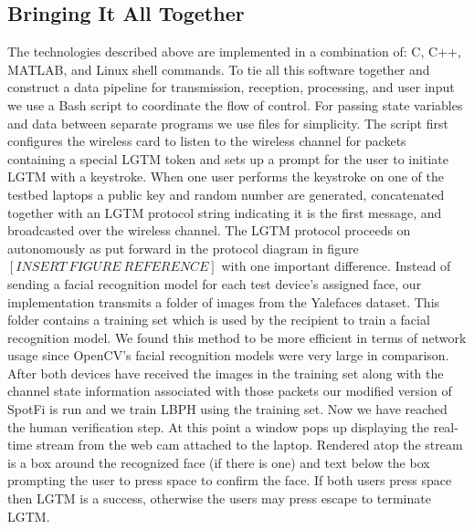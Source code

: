 \documentclass[12pt]{report}
\begin{document}
\subsection{Bringing It All Together}
The technologies described above are implemented in a combination of: C, C++, MATLAB, and Linux shell commands. To tie all this software together and construct a data pipeline for transmission, reception, processing, and user input we use a Bash script to coordinate the flow of control. For passing state variables and data between separate programs we use files for simplicity. The script first configures the wireless card to listen to the wireless channel for packets containing a special LGTM token and sets up a prompt for the user to initiate LGTM with a keystroke. When one user performs the keystroke on one of the testbed laptops a public key and random number are generated, concatenated together with an LGTM protocol string indicating it is the first message, and broadcasted over the wireless channel. The LGTM protocol proceeds on autonomously as put forward in the protocol diagram in figure $[INSERT \: FIGURE \: REFERENCE]$ with one important difference. Instead of sending a facial recognition model for each test device's assigned face, our implementation transmits a folder of images from the Yalefaces dataset. This folder contains a training set which is used by the recipient to train a facial recognition model. We found this method to be more efficient in terms of network usage since OpenCV's facial recognition models were very large in comparison. After both devices have received the images in the training set along with the channel state information associated with those packets our modified version of SpotFi is run and we train LBPH using the training set. Now we have reached the human verification step. At this point a window pops up displaying the real-time stream from the web cam attached to the laptop. Rendered atop the stream is a box around the recognized face (if there is one) and text below the box prompting the user to press space to confirm the face. If both users press space then LGTM is a success, otherwise the users may press escape to terminate LGTM. \par


\end{document}
